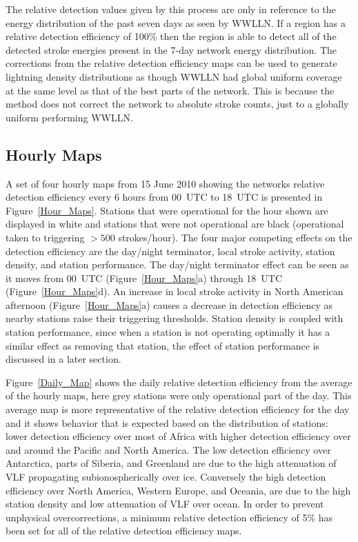 \documentclass[draft,ras]{agutex}
\begin{document}
\begin{article}
The relative detection values given by this process are only in reference to the energy distribution of the past seven days as seen by WWLLN. If a region has a relative detection efficiency of 100\% then the region is able to detect all of the detected stroke energies present in the 7-day network energy distribution. The corrections from the relative detection efficiency maps can be used to generate lightning density distributions as though WWLLN had global uniform coverage at the same level as that of the best parts of the network. This is because the method does not correct the network to absolute stroke counts, just to a globally uniform performing WWLLN.

\subsection{Hourly Maps}

A set of four hourly maps from 15 June 2010 showing the networks relative detection efficiency every 6 hours from 00~UTC to 18~UTC is presented in Figure~\ref{Hour_Maps}. Stations that were operational for the hour shown are displayed in white and stations that were not operational are black (operational taken to triggering $>500$ strokes/hour). The four major competing effects on the detection efficiency are the day/night terminator, local stroke activity, station density, and station performance. The day/night terminator effect can be seen as it moves from 00~UTC (Figure~\ref{Hour_Maps}a) through 18~UTC (Figure~\ref{Hour_Maps}d). An increase in local stroke activity in North American afternoon (Figure~\ref{Hour_Maps}a) causes a decrease in detection efficiency as nearby stations raise their triggering thresholds. Station density is coupled with station performance, since when a station is not operating optimally it has a similar effect as removing that station, the effect of station performance is discussed in a later section.

Figure~\ref{Daily_Map} shows the daily relative detection efficiency from the average of the hourly maps, here grey stations were only operational part of the day. This average map is more representative of the relative detection efficiency for the day and it shows behavior that is expected based on the distribution of stations: lower detection efficiency over most of Africa with higher detection efficiency over and around the Pacific and North America. The low detection efficiency over Antarctica, parts of Siberia, and Greenland are due to the high attenuation of VLF propagating subionospherically over ice. Conversely the high detection efficiency over North America, Western Europe, and Oceania, are due to the high station density and low attenuation of VLF over ocean. In order to prevent unphysical overcorrections, a minimum relative detection efficiency of 5\% has been set for all of the relative detection efficiency maps.


\end{article}
\end{document}
